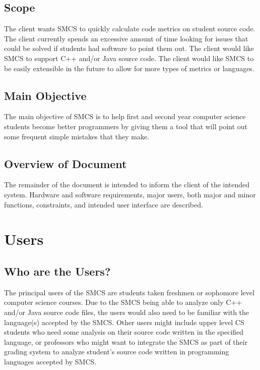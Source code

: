 \documentclass{scrreprt}
\begin{document}
	\section{Scope}
	The client wants SMCS to quickly calculate code metrics on student source code. The client currently spends an excessive amount of time looking for issues that could be solved if students had software to point them out. The client would like SMCS to support C++ and/or Java source code. The client would like SMCS to be easily extensible in the future to allow for more types of metrics or languages.
	\section{Main Objective}
	The main objective of SMCS is to help first and second year computer science students become better programmers by giving them a tool that will point out some frequent simple mistakes that they make.
	\section{Overview of Document}
	The remainder of the document is intended to inform the client of the intended system. Hardware and software requirements, major users, both major and minor functions, constraints, and intended user interface are described.
	\chapter{Users}
	\section{Who are the Users?}
	The principal users of the SMCS are students taken freshmen or sophomore level computer science courses. Due to the SMCS being able to analyze only C++ and/or Java source code files, the users would also need to be familiar with the language(s) accepted by the SMCS. Other users might include upper level CS students who need some analysis on their source code written in the specified language, or professors who might want to integrate the SMCS as part of their grading system to analyze student’s source code written in programming languages accepted by SMCS.
\end{document}
